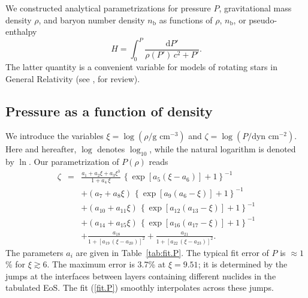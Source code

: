 \documentclass{aa}
\newcommand{\dync}{\mbox{dyn cm$^{-2}$}}
\newcommand{\dd}{\mathrm{d}}
\newcommand{\nb}{n_\mathrm{b}}
\begin{document}
We constructed analytical parametrizations for pressure
$P$, gravitational mass density $\rho$, and baryon number
density $\nb$ as functions of $\rho$,
$\nb$, or pseudo-enthalpy  
\begin{equation}
H = \int_0^P \frac{\dd P'
         }{ \rho (P')\,c^2 +P'}.
\label{H.def}
\end{equation}
The latter quantity is a convenient variable for models of
rotating stars in General Relativity
(see \citealt{Sterg03}, for review).

\subsection{Pressure as a function of density}

We introduce the variables $\xi=\log(\rho/\textrm{g cm}^{-3})$ and
$\zeta = \log(P/\dync)$. Here and hereafter, $\log$ denotes 
$\log_{10}$, while the natural logarithm is denoted by
$\ln$.
Our parametrization of $P(\rho)$ reads
\begin{eqnarray}
  \zeta &=&
    \frac{a_1+a_2\xi+a_3\xi^3}{1+a_4\,\xi}\,
        \left\{\exp\left[a_5(\xi-a_6)\right]+1\right\}^{-1}
\nonumber\\&&
     + (a_7+a_8\xi)\,
        \left\{\exp\left[a_9(a_6-\xi)\right]+1\right\}^{-1}
\nonumber\\&&
     + (a_{10}+a_{11}\xi)\,
\left\{\exp\left[a_{12}(a_{13}-\xi)\right]+1\right\}^{-1}
\nonumber\\&&
     + (a_{14}+a_{15}\xi)\,
\left\{\exp\left[a_{16}(a_{17}-\xi)\right]+1\right\}^{-1}
\nonumber\\&&
     + \frac{a_{18}}{1+ [a_{19}\,(\xi-a_{20})]^2}
     + \frac{a_{21}}{1+ [a_{22}\,(\xi-a_{23})]^2}
     .
\label{fit.P}
\end{eqnarray}
The parameters $a_i$ are given in
Table~\ref{tab:fit.P}. The typical fit error of $P$ is
$\approx1$\% for $\xi\gtrsim6$. The maximum error is 3.7\%
at $\xi=9.51$; it is determined
by the jumps at the interfaces between layers containing
different nuclides in the tabulated EoS. The fit (\ref{fit.P})
smoothly interpolates across these jumps.
\end{document}
